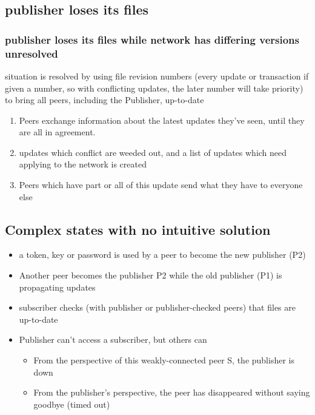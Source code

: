 \documentclass[12pt,a4paper,]{adreport}
\begin{document}
\subsection{publisher loses its files}\label{publisher-loses-its-files}

\subsubsection{publisher loses its files while network has differing
versions
unresolved}\label{publisher-loses-its-files-while-network-has-differing-versions-unresolved}

situation is resolved by using file revision numbers (every update or
transaction if given a number, so with conflicting updates, the later
number will take priority) to bring all peers, including the Publisher,
up-to-date

\begin{enumerate}
\def\labelenumi{\arabic{enumi}.}
\itemsep1pt\parskip0pt
\item
  Peers exchange information about the latest updates they've seen,
  until they are all in agreement.
\item
  updates which conflict are weeded out, and a list of updates which
  need applying to the network is created
\item
  Peers which have part or all of this update send what they have to
  everyone else
\end{enumerate}

\subsection{Complex states with no intuitive
solution}\label{complex-states-with-no-intuitive-solution}

\begin{itemize}
\itemsep1pt\parskip0pt
\item
  a token, key or password is used by a peer to become the new publisher
  (P2)
\item
  Another peer becomes the publisher P2 while the old publisher (P1) is
  propagating updates
\item
  subscriber checks (with publisher or publisher-checked peers) that
  files are up-to-date
\item
  Publisher can't access a subscriber, but others can

  \begin{itemize}
  \itemsep1pt\parskip0pt
  \item
    From the perspective of this weakly-connected peer S, the publisher
    is down
  \item
    From the publisher's perspective, the peer has disappeared without
    saying goodbye (timed out)
  \end{itemize}
\end{itemize}
\end{document}
